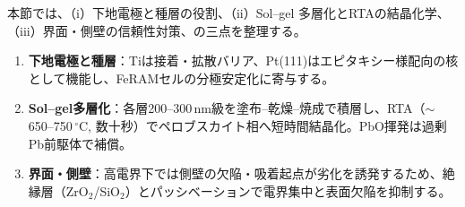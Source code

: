 \documentclass[conference]{IEEEtran}
\begin{document}
本節では、（i）下地電極と種層の役割、（ii）Sol--gel 多層化とRTAの結晶化学、（iii）界面・側壁の信頼性対策、の三点を整理する。
\begin{enumerate}
  \item \textbf{下地電極と種層}：Tiは接着・拡散バリア、Pt(111)はエピタキシー様配向の核として機能し、FeRAMセルの分極安定化に寄与する。
  \item \textbf{Sol--gel多層化}：各層200--300\,nm級を塗布–乾燥–焼成で積層し、RTA（$\sim$650--750\,$^\circ$C, 数十秒）でペロブスカイト相へ短時間結晶化。PbO揮発は過剰Pb前駆体で補償。
  \item \textbf{界面・側壁}：高電界下では側壁の欠陥・吸着起点が劣化を誘発するため、絶縁層（ZrO$_2$/SiO$_2$）とパッシベーションで電界集中と表面欠陥を抑制する。
\end{enumerate}
\end{document}
